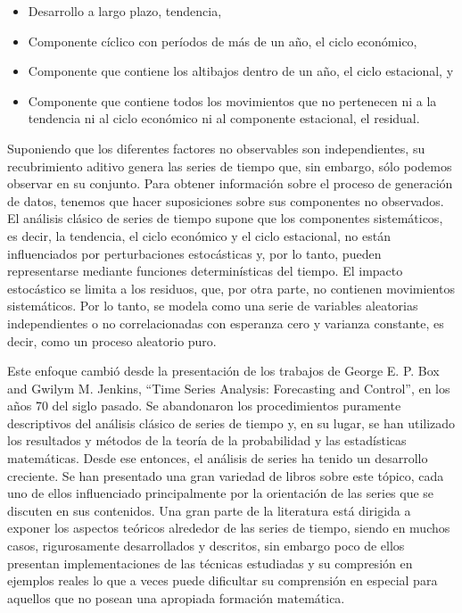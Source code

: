 \documentclass[12pt,]{krantz}
\theoremstyle{definition}
\theoremstyle{definition}
\theoremstyle{definition}
\theoremstyle{remark}
\begin{document}
\begin{itemize}
\item
  Desarrollo a largo plazo, tendencia,
\item
  Componente cíclico con períodos de más de un año, el ciclo económico,
\item
  Componente que contiene los altibajos dentro de un año, el ciclo
  estacional, y
\item
  Componente que contiene todos los movimientos que no pertenecen ni a
  la tendencia ni al ciclo económico ni al componente estacional, el
  residual.
\end{itemize}

Suponiendo que los diferentes factores no observables son
independientes, su recubrimiento aditivo genera las series de tiempo
que, sin embargo, sólo podemos observar en su conjunto. Para obtener
información sobre el proceso de generación de datos, tenemos que hacer
suposiciones sobre sus componentes no observados. El análisis clásico de
series de tiempo supone que los componentes sistemáticos, es decir, la
tendencia, el ciclo económico y el ciclo estacional, no están
influenciados por perturbaciones estocásticas y, por lo tanto, pueden
representarse mediante funciones determinísticas del tiempo. El impacto
estocástico se limita a los residuos, que, por otra parte, no contienen
movimientos sistemáticos. Por lo tanto, se modela como una serie de
variables aleatorias independientes o no correlacionadas con esperanza
cero y varianza constante, es decir, como un proceso aleatorio puro.

Este enfoque cambió desde la presentación de los trabajos de George E.
P. Box and Gwilym M. Jenkins, ``Time Series Analysis: Forecasting and
Control'', en los años 70 del siglo pasado. Se abandonaron los
procedimientos puramente descriptivos del análisis clásico de series de
tiempo y, en su lugar, se han utilizado los resultados y métodos de la
teoría de la probabilidad y las estadísticas matemáticas. Desde ese
entonces, el análisis de series ha tenido un desarrollo creciente. Se
han presentado una gran variedad de libros sobre este tópico, cada uno
de ellos influenciado principalmente por la orientación de las series
que se discuten en sus contenidos. Una gran parte de la literatura está
dirigida a exponer los aspectos teóricos alrededor de las series de
tiempo, siendo en muchos casos, rigurosamente desarrollados y descritos,
sin embargo poco de ellos presentan implementaciones de las técnicas
estudiadas y su compresión en ejemplos reales lo que a veces puede
dificultar su comprensión en especial para aquellos que no posean una
apropiada formación matemática.
\end{document}
